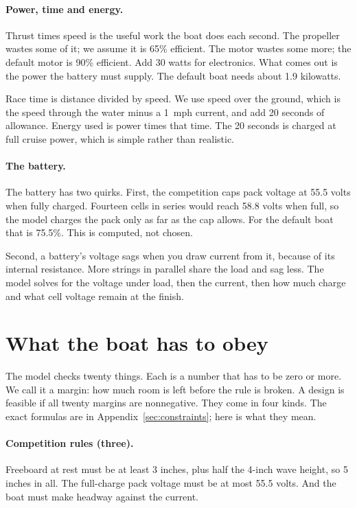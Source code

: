 \documentclass[11pt,a4paper]{article}
\renewcommand{\_}{\textunderscore\allowbreak}
\begin{document}
\paragraph{Power, time and energy.} Thrust times speed is the useful work the boat does each second. The propeller wastes some of it; we assume it is 65\% efficient. The motor wastes some more; the default motor is 90\% efficient.
Add 30 watts for electronics. What comes out is the power the battery must supply. The default boat needs about 1.9 kilowatts.

Race time is distance divided by speed. We use speed over the ground, which is the speed through the water minus a 1~mph current, and add 20 seconds of allowance. Energy used is power times that time.
The 20 seconds is charged at full cruise power, which is simple rather than realistic.

\paragraph{The battery.} The battery has two quirks. First, the competition caps pack voltage at 55.5 volts when fully charged. Fourteen cells in series would reach 58.8 volts when full, so the model charges the pack only as far as the cap allows.
For the default boat that is 75.5\%. This is computed, not chosen.

Second, a battery's voltage sags when you draw current from it, because of its internal resistance. More strings in parallel share the load and sag less. The model solves for the voltage under load, then the current,
then how much charge and what cell voltage remain at the finish.

\section*{What the boat has to obey}

The model checks twenty things. Each is a number that has to be zero or more. We call it a margin: how much room is left before the rule is broken. A design is feasible if all twenty margins are nonnegative.
They come in four kinds. The exact formulas are in Appendix~\ref{sec:constraints}; here is what they mean.

\paragraph{Competition rules (three).} Freeboard at rest must be at least 3 inches, plus half the 4-inch wave height, so 5 inches in all. The full-charge pack voltage must be at most 55.5 volts.
And the boat must make headway against the current.
\end{document}
